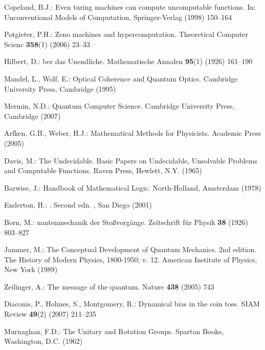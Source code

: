 \documentclass{llncs}
\begin{document}
\begin{thebibliography}{10}
Copeland, B.J.:
\newblock Even turing machines can compute uncomputable functions.
\newblock In: Unconventional Models of Computation, Springer-Verlag (1998)
  150--164

Potgieter, P.H.:
\newblock Zeno machines and hypercomputation.
\newblock Theoretical Computer Scienc \textbf{358}(1) (2006)  23--33

Hilbert, D.:
ber das {U}nendliche.
\newblock Mathematische Annalen \textbf{95}(1) (1926)  161--190

Mandel, L., Wolf, E.:
\newblock Optical Coherence and Quantum Optics.
\newblock Cambridge University Press, Cambridge (1995)

Mermin, N.D.:
\newblock Quantum Computer Science.
\newblock Cambridge University Press, Cambridge (2007)

Arfken, G.B., Weber, H.J.:
\newblock Mathematical Methods for Physicists.
\newblock Academic Press (2005)

Davis, M.:
\newblock The Undecidable. Basic Papers on Undecidable, Unsolvable Problems and
  Computable Functions.
\newblock Raven Press, Hewlett, N.Y. (1965)

Barwise, J.:
\newblock Handbook of Mathematical Logic.
\newblock North-Holland, Amsterdam (1978)

Enderton, H.:
. Second edn.
, San Diego (2001)

Born, M.:
uantenmechanik der {S}to{\ss}vorg{\"{a}}nge.
\newblock Zeitschrift f{\"{u}}r Physik \textbf{38} (1926)  803--827

Jammer, M.:
\newblock The Conceptual Development of Quantum Mechanics. 2nd edition. The
  History of Modern Physics, 1800-1950; v. 12.
\newblock American Institute of Physics, New York (1989)

Zeilinger, A.:
\newblock The message of the quantum.
\newblock Nature \textbf{438} (2005)  743

Diaconis, P., Holmes, S., Montgomery, R.:
\newblock Dynamical bias in the coin toss.
\newblock SIAM Review \textbf{49}(2) (2007)  211--235

Murnaghan, F.D.:
\newblock The Unitary and Rotation Groups.
\newblock Spartan Books, Washington, D.C. (1962)


\end{thebibliography}
\end{document}
